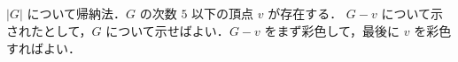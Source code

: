 \subsection{}
$|G|$ について帰納法．$G$ の次数 $5$ 以下の頂点 $v$ が存在する．
$G-v$ について示されたとして，$G$ について示せばよい．$G-v$ をまず彩色して，最後に $v$ を彩色すればよい．
